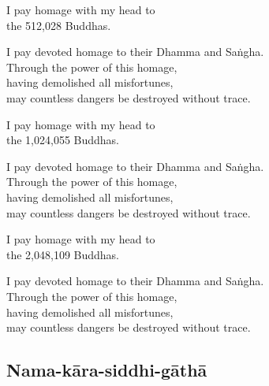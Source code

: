 
I pay homage with my head to\\
the 512,028 Buddhas.

I pay devoted homage to their Dhamma and Saṅgha.\\
Through the power of this homage,\\
having demolished all misfortunes,\\
may countless dangers be destroyed without trace.

I pay homage with my head to\\
the 1,024,055 Buddhas.

I pay devoted homage to their Dhamma and Saṅgha.\\
Through the power of this homage,\\
having demolished all misfortunes,\\
may countless dangers be destroyed without trace.

I pay homage with my head to\\
the 2,048,109 Buddhas.

I pay devoted homage to their Dhamma and Saṅgha.\\
Through the power of this homage,\\
having demolished all misfortunes,\\
may countless dangers be destroyed without trace.

\subsection{Nama-kāra-siddhi-gāthā}
\label{yo-cakkhuma}


